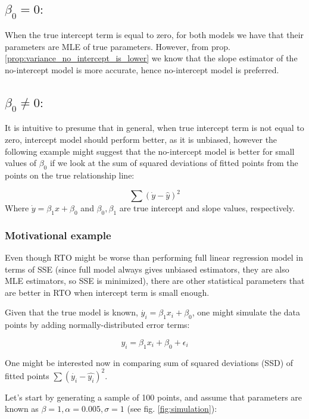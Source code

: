 \documentclass[12pt,a4paper,oneside]{book} %
\begin{document}
\subsection{$\beta_0 = 0:$}

When the true intercept term is equal to zero, for both models we have that their parameters are MLE of true parameters. However, from prop. \ref{prop:variance_no_intercept_is_lower} we know that the slope estimator of the no-intercept model is more accurate, hence no-intercept model is preferred.


\subsection{$\beta_0 \neq 0:$}

It is intuitive to presume that in general, when true intercept term is not equal to zero, intercept model should perform better, as it is unbiased, however the following example might suggest that the no-intercept model is better for small values of $\beta_0$ if we look at the sum of squared deviations of fitted points from the points on the true relationship line:

\[
	\sum (\dot{y}-\hat{y})^2
\]
Where $\dot{y}=\beta_1 x + \beta_0$ and $\beta_0, \beta_1$ are true intercept and slope values, respectively.

	\subsubsection{Motivational example}

Even though RTO might be worse than performing full linear regression model in terms of SSE (since full model always gives unbiased estimators, they are also MLE estimators, so SSE is minimized), there are other statistical parameters that are better in RTO when intercept term is small enough.

Given that the true model is known, $\dot{y_i} = \beta_1 x_i + \beta_0$, one might simulate the data points by adding normally-distributed error terms:

\[
	y_i =  \beta_1 x_i + \beta_0 + \epsilon_i
\]

One might be interested now in comparing sum of squared deviations (SSD) of fitted points $\sum (\dot{y_i}-\hat{y_i})^2 $.

Let's start by generating a sample of 100 points, and assume that parameters are known as $\beta = 1, \alpha = 0.005, \sigma=1$ (see fig. \ref{fig:simulation}):
\end{document}
